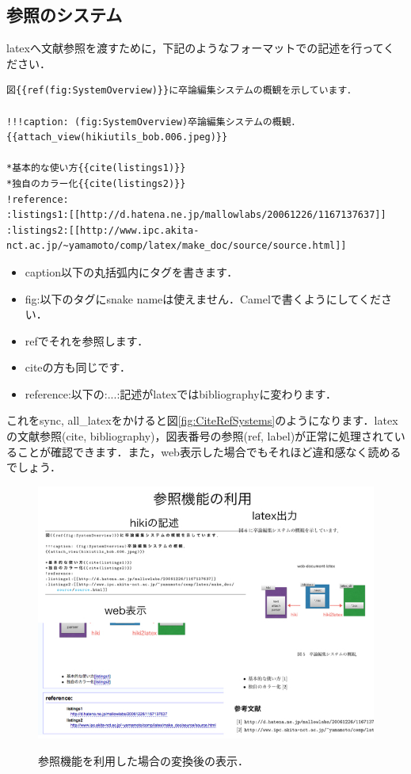 \subsection{参照のシステム}
latexへ文献参照を渡すために，下記のようなフォーマットでの記述を行ってください．
\begin{lstlisting}[style=customCsh,basicstyle={\scriptsize\ttfamily}]
図{{ref(fig:SystemOverview)}}に卒論編集システムの概観を示しています．

!!!caption: (fig:SystemOverview)卒論編集システムの概観．
{{attach_view(hikiutils_bob.006.jpeg)}}

*基本的な使い方{{cite(listings1)}}
*独自のカラー化{{cite(listings2)}}
!reference:
:listings1:[[http://d.hatena.ne.jp/mallowlabs/20061226/1167137637]]
:listings2:[[http://www.ipc.akita-nct.ac.jp/~yamamoto/comp/latex/make_doc/source/source.html]]
\end{lstlisting}
\begin{itemize}
\item caption以下の丸括弧内にタグを書きます．
\item fig:以下のタグにsnake nameは使えません．Camelで書くようにしてください．
\item refでそれを参照します．
\item citeの方も同じです．
\item reference:以下の:...:記述がlatexではbibliographyに変わります．
\end{itemize}
これをsync, all\_latexをかけると図\ref{fig:CiteRefSystems}のようになります．latexの文献参照(cite, bibliography)，図表番号の参照(ref, label)が正常に処理されていることが確認できます．また，web表示した場合でもそれほど違和感なく読めるでしょう．

\begin{figure}[htbp]\begin{center}
\includegraphics[width=12cm,bb= 0 0 737 553]{../figs/./hikiutils_bob.007.jpeg}
\caption{参照機能を利用した場合の変換後の表示．}
\label{fig:CiteRefSystems}
\label{default}\end{center}\end{figure}
